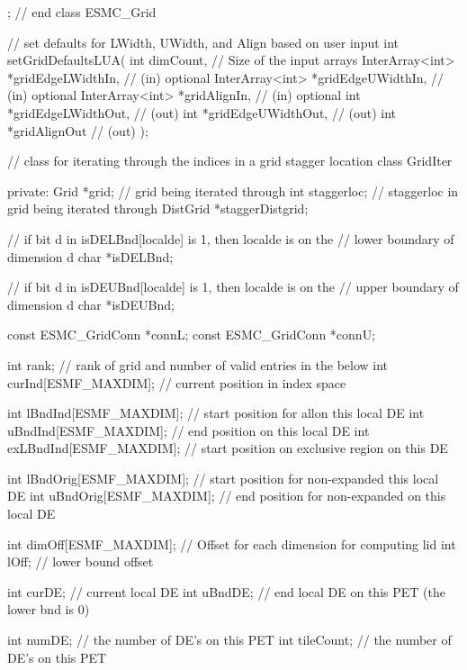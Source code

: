 {{ };  // end class ESMC_Grid
 
   // set defaults for LWidth, UWidth, and Align based on user input
   int setGridDefaultsLUA(
                        int dimCount,                // Size of the input arrays
                        InterArray<int> *gridEdgeLWidthIn,  // (in) optional
                        InterArray<int> *gridEdgeUWidthIn,  // (in) optional
                        InterArray<int> *gridAlignIn,   // (in) optional
                        int *gridEdgeLWidthOut,          // (out)
                        int *gridEdgeUWidthOut,          // (out)
                        int *gridAlignOut            // (out)
                        );
 
   
 
   // class for iterating through the indices in a grid stagger location
   class GridIter {
   private:
     Grid *grid;     // grid being iterated through
     int staggerloc; // staggerloc in grid being iterated through
     DistGrid *staggerDistgrid;
 
     // if bit d in isDELBnd[localde] is 1, then localde is on the
     // lower boundary of dimension d
     char *isDELBnd;
  
     // if bit d in isDEUBnd[localde] is 1, then localde is on the
     // upper boundary of dimension d
     char *isDEUBnd;
     
 
     const ESMC_GridConn *connL;
     const ESMC_GridConn *connU;
     
     int rank; // rank of grid and number of valid entries in the below
     int curInd[ESMF_MAXDIM];  // current position in index space
 
     int lBndInd[ESMF_MAXDIM]; // start position for allon this local DE  
     int uBndInd[ESMF_MAXDIM]; // end position on this local DE  
     int exLBndInd[ESMF_MAXDIM]; // start position on exclusive region on this DE
 
     int lBndOrig[ESMF_MAXDIM]; // start position for non-expanded this local DE
     int uBndOrig[ESMF_MAXDIM]; // end position for non-expanded on this local DE  
 
     int dimOff[ESMF_MAXDIM]; // Offset for each dimension for computing lid
     int lOff;                // lower bound offset
     
     int curDE; // current local DE
     int uBndDE; // end local DE on this PET (the lower bnd is 0)
 
     int numDE; // the number of DE's on this PET
     int tileCount; // the number of DE's on this PET
 
}}
